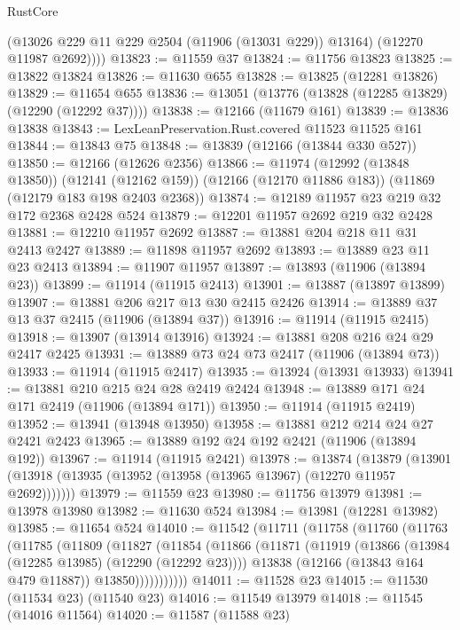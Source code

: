 \begin{lexlean}{RustCore}
\begin{coremodule}
          (@13026 @229 @11 @229 @2504 (@11906 (@13031 @229)) @13164)
          (@12270 @11987 @2692))))
@13823 := @11559 @37
@13824 := @11756 @13823
@13825 := @13822 @13824
@13826 := @11630 @655
@13828 := @13825 (@12281 @13826)
@13829 := @11654 @655
@13836 := @13051 (@13776 (@13828 (@12285 @13829) (@12290 (@12292 @37))))
@13838 := @12166 (@11679 @161)
@13839 := @13836 @13838
@13843 := LexLeanPreservation.Rust.covered @11523 @11525 @161
@13844 := @13843 @75
@13848 := @13839 (@12166 (@13844 @330 @527))
@13850 := @12166 (@12626 @2356)
@13866 := @11974
    (@12992 (@13848 @13850))
    (@12141 (@12162 @159))
    (@12166 (@12170 @11886 @183))
    (@11869 (@12179 @183 @198 @2403 @2368))
@13874 := @12189 @11957 @23 @219 @32 @172 @2368 @2428 @524
@13879 := @12201 @11957 @2692 @219 @32 @2428
@13881 := @12210 @11957 @2692
@13887 := @13881 @204 @218 @11 @31 @2413 @2427
@13889 := @11898 @11957 @2692
@13893 := @13889 @23 @11 @23 @2413
@13894 := @11907 @11957
@13897 := @13893 (@11906 (@13894 @23))
@13899 := @11914 (@11915 @2413)
@13901 := @13887 (@13897 @13899)
@13907 := @13881 @206 @217 @13 @30 @2415 @2426
@13914 := @13889 @37 @13 @37 @2415 (@11906 (@13894 @37))
@13916 := @11914 (@11915 @2415)
@13918 := @13907 (@13914 @13916)
@13924 := @13881 @208 @216 @24 @29 @2417 @2425
@13931 := @13889 @73 @24 @73 @2417 (@11906 (@13894 @73))
@13933 := @11914 (@11915 @2417)
@13935 := @13924 (@13931 @13933)
@13941 := @13881 @210 @215 @24 @28 @2419 @2424
@13948 := @13889 @171 @24 @171 @2419 (@11906 (@13894 @171))
@13950 := @11914 (@11915 @2419)
@13952 := @13941 (@13948 @13950)
@13958 := @13881 @212 @214 @24 @27 @2421 @2423
@13965 := @13889 @192 @24 @192 @2421 (@11906 (@13894 @192))
@13967 := @11914 (@11915 @2421)
@13978 := @13874
    (@13879 (@13901 (@13918 (@13935 (@13952 (@13958 (@13965 @13967) (@12270 @11957 @2692)))))))
@13979 := @11559 @23
@13980 := @11756 @13979
@13981 := @13978 @13980
@13982 := @11630 @524
@13984 := @13981 (@12281 @13982)
@13985 := @11654 @524
@14010 := @11542
    (@11711
      (@11758
        (@11760
          (@11763
            (@11785
              (@11809
                (@11827
                  (@11854
                    (@11866
                      (@11871
                        (@11919
                          (@13866 (@13984 (@12285 @13985) (@12290 (@12292 @23))))
                          @13838
                          (@12166 (@13843 @164 @479 @11887))
                          @13850)))))))))))
@14011 := @11528 @23
@14015 := @11530 (@11534 @23) (@11540 @23)
@14016 := @11549 @13979
@14018 := @11545 (@14016 @11564)
@14020 := @11587 (@11588 @23)

\end{coremodule}
\end{lexlean}
